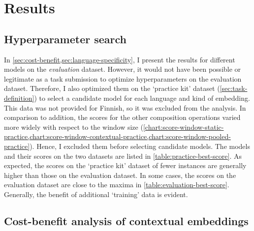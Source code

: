 \section{Results}
\label{sec:results}

\subsection{Hyperparameter search}
\label{sec:hyperparameter-search}



In \cref{sec:cost-benefit,sec:language-specificity}, I present the results for
different models on the \emph{evaluation} dataset.
However, it would not have been possible or legitimate as a task submission to optimize
hyperparameters on the evaluation dataset.
Therefore, I also optimized them on the `practice kit' dataset
(\cref{sec:task-definition}) to select a candidate model for each language and kind of
embedding.
This data was not provided for Finnish, so it was excluded from the analysis.
In comparison to addition, the scores for the other composition operations varied more
widely with respect to the window size
(\cref{chart:score-window-static-practice,chart:score-window-contextual-practice,chart:score-window-pooled-practice}).
Hence, I excluded them before selecting candidate models.
The models and their scores on the two datasets are listed in
\cref{table:practice-best-score}.
As expected, the scores on the `practice kit' dataset of fewer instances are generally
higher than those on the evaluation dataset.
In some cases, the scores on the evaluation dataset are close to the maxima in
\cref{table:evaluation-best-score}.
Generally, the benefit of additional `training' data is evident.



\subsection{Cost-benefit analysis of contextual embeddings}
\label{sec:cost-benefit}





